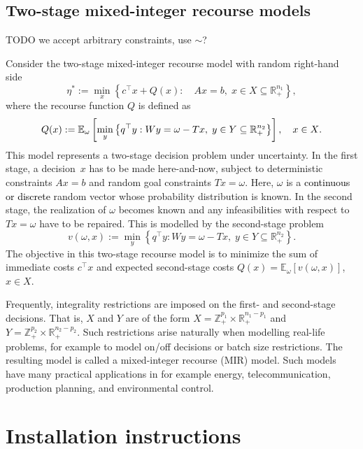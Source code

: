 \documentclass[12pt, english]{article}
\newcommand{\red}{\textcolor{black}}
\begin{document}
\subsection{Two-stage mixed-integer recourse models\label{subsec:model}}

TODO we accept arbitrary constraints, use $\sim$?

Consider the two-stage mixed-integer recourse model with random right-hand side \begin{equation}\label{etastar}\eta^* := \min_{x}\left\{c^{\top}x + Q(x) :\quad Ax = b,\;x \in X\subseteq \mathbb{R}^{n_1}_+\right\},\end{equation} where the recourse function $Q$ is defined as \begin{equation}\label{defQ}Q(x):=\mathbb{E}_{\omega}\left[ \min_y \left\{   q^{\top}y: Wy = \omega - Tx,\; y \in Y \subseteq \mathbb R^{n_2 }_+\right\}\right]  , \quad x\in \red{X}. \end{equation}This model represents a two-stage decision problem under uncertainty. In the first stage, a decision~$x$ has to be made here-and-now, subject to deterministic constraints $Ax = b$ and random goal constraints $Tx = \omega$. Here, $\omega$ is a \red{continuous or discrete} random vector whose probability distribution is known. In the second stage, the realization of $\omega$ becomes known and any infeasibilities with respect to $Tx = \omega$ have to be repaired. This is modelled by the second-stage problem \begin{equation}\label{vwx}v(\omega,x) := \min_y \left\{   q^{\top}y:Wy = \omega - Tx,\; y \in Y \subseteq  \mathbb{R} ^{n_2 }_+\right\}.\end{equation}The objective in this two-stage recourse model is to minimize the sum of immediate costs $c^{\top}x$ and expected second-stage costs $Q(x) = \mathbb{E}_\omega[v(\omega,x)]$, ${x \in X}$.

Frequently, integrality restrictions are imposed on the first- and second-stage decisions. That is, $X$ and $Y$ are of the form $X = \mathbb Z^{p_1}_+ \times \mathbb{R}^{n_1 - p_1}_+$ and $Y = \mathbb Z^{p_2}_+\times \mathbb{R}^{n_2 - p_2}_+$. Such restrictions arise naturally when modelling real-life problems, for example to model on/off decisions or batch size restrictions. The resulting model is called a mixed-integer recourse (MIR) model.
Such models have many practical applications in for example energy, telecommunication, production planning, and environmental control.

\section{Installation instructions}
\label{sec:installation_instructions}
\end{document}
